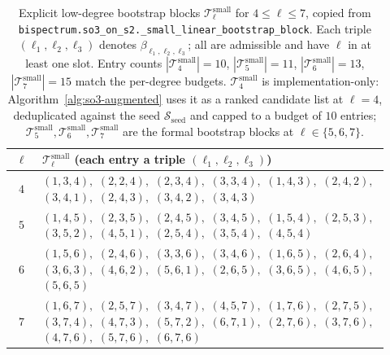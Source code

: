 \documentclass{article}
\theoremstyle{definition}
\theoremstyle{remark}
\theoremstyle{definition}
\begin{document}
\begin{table}[h]
  \caption{Explicit low-degree bootstrap blocks
    $\mathcal{T}_\ell^{\mathrm{small}}$ for $4\le\ell\le 7$, copied
    from \texttt{bispectrum.so3\_on\_s2.\_small\_linear\_bootstrap\_block}.
    Each triple $(\ell_1,\ell_2,\ell_3)$ denotes
    $\beta_{\ell_1,\ell_2,\ell_3}$; all are admissible and have
    $\ell$ in at least one slot. Entry counts
    $|\mathcal{T}_4^{\mathrm{small}}|=10$,
    $|\mathcal{T}_5^{\mathrm{small}}|=11$,
    $|\mathcal{T}_6^{\mathrm{small}}|=13$,
    $|\mathcal{T}_7^{\mathrm{small}}|=15$ match the per-degree budgets.
    $\mathcal{T}_4^{\mathrm{small}}$ is implementation-only:
    Algorithm~\ref{alg:so3-augmented} uses it as a ranked candidate
    list at $\ell=4$, deduplicated against the seed
    $\mathcal{S}_{\mathrm{seed}}$ and capped to a budget of $10$ entries;
    $\mathcal{T}_5^{\mathrm{small}},\mathcal{T}_6^{\mathrm{small}},\mathcal{T}_7^{\mathrm{small}}$
    are the formal bootstrap blocks at $\ell\in\{5,6,7\}$.}
  \label{tab:Tsmall}
  \centering
  \small
  \setlength{\tabcolsep}{4pt}
  \footnotesize
  \begin{tabular}{@{}cp{0.92\linewidth}@{}}
    \toprule
    $\ell$ & $\mathcal{T}_\ell^{\mathrm{small}}$ (each entry a triple $(\ell_1,\ell_2,\ell_3)$) \\
    \midrule
    $4$ & $(1,3,4),$ $(2,2,4),$ $(2,3,4),$ $(3,3,4),$ $(1,4,3),$ $(2,4,2),$ $(3,4,1),$ $(2,4,3),$ $(3,4,2),$ $(3,4,3)$ \\
    $5$ & $(1,4,5),$ $(2,3,5),$ $(2,4,5),$ $(3,4,5),$ $(1,5,4),$ $(2,5,3),$ $(3,5,2),$ $(4,5,1),$ $(2,5,4),$ $(3,5,4),$ $(4,5,4)$ \\
    $6$ & $(1,5,6),$ $(2,4,6),$ $(3,3,6),$ $(3,4,6),$ $(1,6,5),$ $(2,6,4),$ $(3,6,3),$ $(4,6,2),$ $(5,6,1),$ $(2,6,5),$ $(3,6,5),$ $(4,6,5),$ $(5,6,5)$ \\
    $7$ & $(1,6,7),$ $(2,5,7),$ $(3,4,7),$ $(4,5,7),$ $(1,7,6),$ $(2,7,5),$ $(3,7,4),$ $(4,7,3),$ $(5,7,2),$ $(6,7,1),$ $(2,7,6),$ $(3,7,6),$ $(4,7,6),$ $(5,7,6),$ $(6,7,6)$ \\
    \bottomrule
  \end{tabular}
\end{table}
\end{document}
